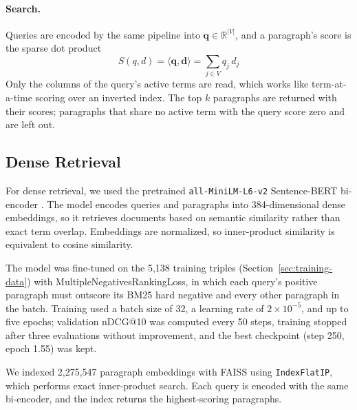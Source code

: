 \documentclass[sigconf,nonacm]{acmart}
\begin{document}
\paragraph{Search.}
Queries are encoded by the same pipeline into $\mathbf{q} \in \mathbb{R}^{|V|}$, and a
paragraph's score is the sparse dot product
\begin{equation}
    S(q, d) = \langle \mathbf{q}, \mathbf{d} \rangle = \sum_{j \in V} q_j \, d_j
\end{equation}
Only the columns of the query's active terms are read, which works like term-at-a-time
scoring over an inverted index. The top $k$ paragraphs are returned with their scores;
paragraphs that share no active term with the query score zero and are left out.


\subsection{Dense Retrieval}
\label{sec:dense}
For dense retrieval, we used the pretrained \texttt{all-MiniLM-L6-v2}
Sentence-BERT bi-encoder \cite{wang2020minilm,reimers2019sentence}. The model
encodes queries and paragraphs into 384-dimensional dense embeddings, so it
retrieves documents based on semantic similarity rather than exact term
overlap. Embeddings are normalized, so inner-product similarity is equivalent
to cosine similarity.

The model was fine-tuned on the 5,138 training triples
(Section~\ref{sec:training-data}) with MultipleNegativesRankingLoss, in
which each query's positive paragraph must outscore its BM25 hard negative
and every other paragraph in the batch. Training used a batch size of 32,
a learning rate of $2 \times 10^{-5}$, and up to five epochs; validation
nDCG@10 was computed every 50 steps, training stopped after three
evaluations without improvement, and the best checkpoint (step 250,
epoch 1.55) was kept.

We indexed 2,275,547 paragraph embeddings with FAISS \cite{johnson2019billion}
using \texttt{IndexFlatIP}, which performs exact inner-product search. Each
query is encoded with the same bi-encoder, and the index returns the
highest-scoring paragraphs.
\end{document}
